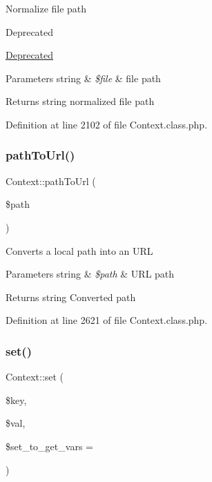 Normalize file path

\begin{DoxyRefDesc}{Deprecated}
\item[\hyperlink{deprecated__deprecated000002}{Deprecated}]\end{DoxyRefDesc}

\begin{DoxyParams}[1]{Parameters}
string & {\em \$file} & file path \\
\hline
\end{DoxyParams}
\begin{DoxyReturn}{Returns}
string normalized file path 
\end{DoxyReturn}


Definition at line 2102 of file Context.\+class.\+php.

\mbox{\label{classContext_a6012ceb6e62fc99b0e2b24e475ba4da7}} 
\subsubsection{\texorpdfstring{path\+To\+Url()}{pathToUrl()}}
{\footnotesize\ttfamily Context\+::path\+To\+Url (\begin{DoxyParamCaption}\item[{}]{\$path }\end{DoxyParamCaption})}

Converts a local path into an U\+RL


\begin{DoxyParams}[1]{Parameters}
string & {\em \$path} & U\+RL path \\
\hline
\end{DoxyParams}
\begin{DoxyReturn}{Returns}
string Converted path 
\end{DoxyReturn}


Definition at line 2621 of file Context.\+class.\+php.

\mbox{\label{classContext_a9f79aa7aecf2e4d8006e517844523fc2}} 
\subsubsection{\texorpdfstring{set()}{set()}}
{\footnotesize\ttfamily Context\+::set (\begin{DoxyParamCaption}\item[{}]{\$key,  }\item[{}]{\$val,  }\item[{}]{\$set\+\_\+to\+\_\+get\+\_\+vars = {} }\end{DoxyParamCaption})}

